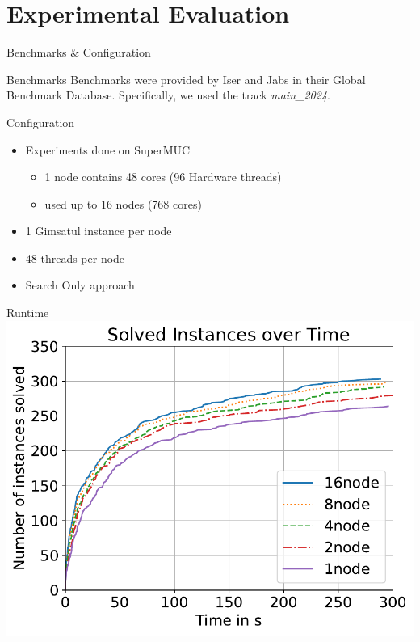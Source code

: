 \documentclass{beamer}
\begin{document}
\section{Experimental Evaluation}
\begin{frame}{Benchmarks \& Configuration}
    \begin{block}{Benchmarks}
        Benchmarks were provided by Iser and Jabs in 
        their Global Benchmark Database. Specifically, 
        we used the track \textit{main\_2024}.
    \end{block}

    \begin{block}{Configuration}
        \begin{itemize}
            \item Experiments done on SuperMUC
            \begin{itemize}
                \item 1 node contains 48 cores (96 Hardware threads)
                \item used up to 16 nodes (768 cores)
            \end{itemize}
            \item 1 Gimsatul instance per node
            \item 48 threads per node
            \item Search Only approach
        \end{itemize}
    \end{block}
\end{frame}

\begin{frame}{Runtime}
    \center
    \includegraphics[scale=.55]{plots/cumulative_runtime/scalability_gim.pdf}
\end{frame}
\end{document}
